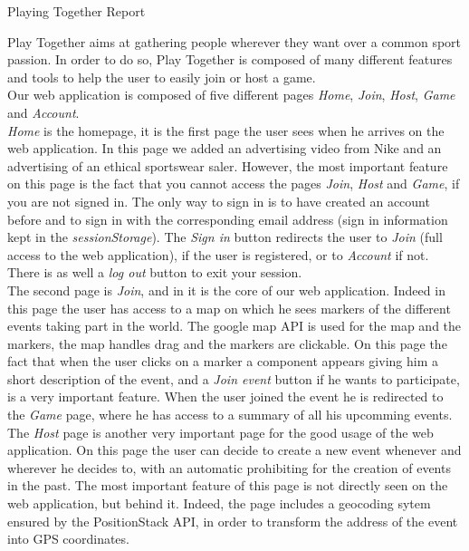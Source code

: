 \documentclass[]{article}
\begin{document}
\begin{center}
	\begin{huge}
	Playing Together Report
	\end{huge}
\end{center}
\vskip 0.5cm

Play Together aims at gathering people wherever they want over a common sport passion. In order to do so, Play Together is composed of many different features and tools to help the user to easily join or host a game.\\
Our web application is composed of five different pages \textit{Home}, \textit{Join}, \textit{Host}, \textit{Game} and \textit{Account}.\\ 

\textit{Home} is the homepage, it is the first page the user sees when he arrives on the web application. 
In this page we added an advertising video from Nike and an advertising of an ethical sportswear saler. However, the most important feature on this page is the fact that you cannot access the pages \textit{Join}, \textit{Host} and \textit{Game}, if you are not signed in. The only way to sign in is to have created an account before and to sign in with the corresponding email address (sign in information kept in the \textit{sessionStorage}). The \textit{Sign in} button redirects the user to \textit{Join} (full access to the web application), if the user is registered, or to \textit{Account} if not. There is as well a \textit{log out} button to exit your session.\\

The second page is \textit{Join}, and in it is the core of our web application. Indeed in this page the user has access to a map on which he sees markers of the different events taking part in the world. The google map API is used for the map and the markers, the map handles drag and the markers are clickable. On this page the fact that  when the user clicks on a marker a component appears giving him a short description of the event, and a \textit{Join event} button if he wants to participate, is a very important feature. When the user joined the event he is redirected to the \textit{Game} page, where he has access to a summary of all his upcomming events.\\

The \textit{Host} page is another very important page for the good usage of the web application. On this page the user can decide to create a new event whenever and wherever he decides to, with an automatic prohibiting for the creation of events in the past. The most important feature of this page is not directly seen on the web application, but behind it. Indeed, the page includes a geocoding sytem ensured by the PositionStack API, in order to transform the address of the event into GPS coordinates.\\
\end{document}
